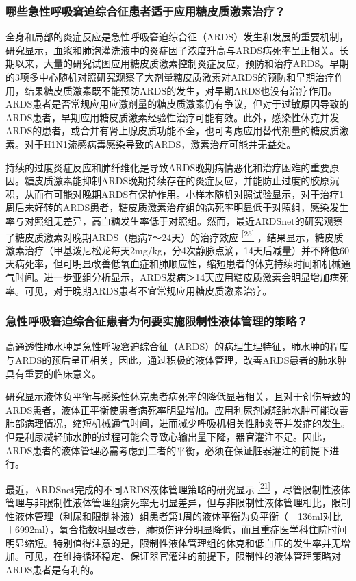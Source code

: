 \subsubsection{哪些急性呼吸窘迫综合征患者适于应用糖皮质激素治疗？}

全身和局部的炎症反应是急性呼吸窘迫综合征（ARDS）发生和发展的重要机制，研究显示，血浆和肺泡灌洗液中的炎症因子浓度升高与ARDS病死率呈正相关。长期以来，大量的研究试图应用糖皮质激素控制炎症反应，预防和治疗ARDS。早期的3项多中心随机对照研究观察了大剂量糖皮质激素对ARDS的预防和早期治疗作用，结果糖皮质激素既不能预防ARDS的发生，对早期ARDS也没有治疗作用。ARDS患者是否常规应用应激剂量的糖皮质激素仍有争议，但对于过敏原因导致的ARDS患者，早期应用糖皮质激素经验性治疗可能有效。此外，感染性休克并发ARDS的患者，或合并有肾上腺皮质功能不全，也可考虑应用替代剂量的糖皮质激素。对于H1N1流感病毒感染导致的ARDS，激素治疗可能并无益处。

持续的过度炎症反应和肺纤维化是导致ARDS晚期病情恶化和治疗困难的重要原因。糖皮质激素能抑制ARDS晚期持续存在的炎症反应，并能防止过度的胶原沉积，从而有可能对晚期ARDS有保护作用。小样本随机对照试验显示，对于治疗1周后未好转的ARDS患者，糖皮质激素治疗组的病死率明显低于对照组，感染发生率与对照组无差异，高血糖发生率低于对照组。然而，最近ARDSnet的研究观察了糖皮质激素对晚期ARDS（患病7～24天）的治疗效应
\protect\hyperlink{text00011.htmlux5cux23ch25-10}{\textsuperscript{{[}25{]}}}
，结果显示，糖皮质激素治疗（甲基泼尼松龙每天2mg/kg，分4次静脉点滴，14天后减量）并不降低60天病死率，但可明显改善低氧血症和肺顺应性，缩短患者的休克持续时间和机械通气时间。进一步亚组分析显示，ARDS发病＞14天应用糖皮质激素会明显增加病死率。可见，对于晚期ARDS患者不宜常规应用糖皮质激素治疗。

\subsubsection{急性呼吸窘迫综合征患者为何要实施限制性液体管理的策略？}

高通透性肺水肿是急性呼吸窘迫综合征（ARDS）的病理生理特征，肺水肿的程度与ARDS的预后呈正相关，因此，通过积极的液体管理，改善ARDS患者的肺水肿具有重要的临床意义。

研究显示液体负平衡与感染性休克患者病死率的降低显著相关，且对于创伤导致的ARDS患者，液体正平衡使患者病死率明显增加。应用利尿剂减轻肺水肿可能改善肺部病理情况，缩短机械通气时间，进而减少呼吸机相关性肺炎等并发症的发生。但是利尿减轻肺水肿的过程可能会导致心输出量下降，器官灌注不足。因此，ARDS患者的液体管理必需考虑到二者的平衡，必须在保证脏器灌注的前提下进行。

最近，ARDSnet完成的不同ARDS液体管理策略的研究显示
\protect\hyperlink{text00011.htmlux5cux23ch21-10}{\textsuperscript{{[}21{]}}}
，尽管限制性液体管理与非限制性液体管理组病死率无明显差异，但与非限制性液体管理相比，限制性液体管理（利尿和限制补液）组患者第1周的液体平衡为负平衡（－136ml对比＋6992ml），氧合指数明显改善，肺损伤评分明显降低，而且重症医学科住院时间明显缩短。特别值得注意的是，限制性液体管理组的休克和低血压的发生率并无增加。可见，在维持循环稳定、保证器官灌注的前提下，限制性的液体管理策略对ARDS患者是有利的。


